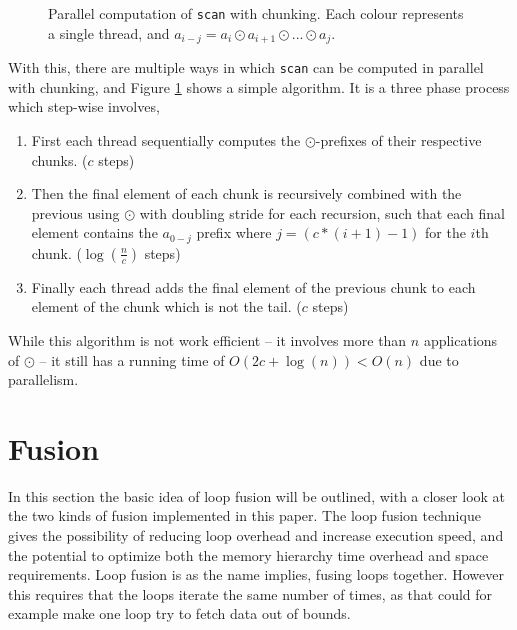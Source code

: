 \documentclass[11pt]{article}
\begin{document}
\begin{figure}[h!]
  
  \caption{Parallel computation of \texttt{scan} with chunking. Each colour represents a single thread, and $a_{i-j} = a_i \odot a_{i+1} \odot ... \odot a_j$.}
  \label{fig:scancomp1}
\end{figure}
With this, there are multiple ways in which \texttt{scan} can be computed in parallel with chunking, and Figure \ref{fig:scancomp1} shows a simple algorithm.
 It is a three phase process which step-wise involves,
 \begin{enumerate}
 \item First each thread sequentially computes the $\odot$-prefixes of their respective chunks. ($c$ steps)
 \item Then the final element of each chunk is recursively combined with the previous using $\odot$ with
 doubling stride for each recursion, such that each final element contains the $a_{0-j}$ prefix where $j = (c * (i+1) - 1)$ for the
 $i$th chunk. ($\log(\frac{n}{c})$ steps)
 \item Finally each thread adds the final element of the previous chunk to each element of the chunk
 which is not the tail. ($c$ steps)
 \end{enumerate}
While this algorithm is not work efficient -- it involves more than $n$ applications of $\odot$ -- it still has a running time of $O(2c + \log(n)) < O(n)$ due to parallelism.

\clearpage
\section{Fusion}
In this section the basic idea of loop fusion will be outlined, with a closer look at the two kinds of fusion implemented in this paper.
The loop fusion technique gives the possibility of reducing loop overhead and increase execution speed, and the potential to optimize both the memory hierarchy time overhead and space requirements. Loop fusion is as the name implies, fusing loops together. However this requires that the loops iterate the same number of times, as that could for example make one loop try to fetch data out of bounds. \\
\end{document}
